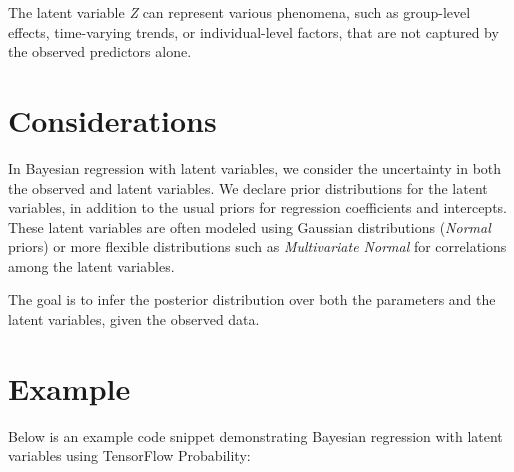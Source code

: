 \documentclass[
  letterpaper,
  DIV=11,
  numbers=noendperiod]{scrreprt}
\begin{document}
The latent variable \emph{Z} can represent various phenomena, such as
group-level effects, time-varying trends, or individual-level factors,
that are not captured by the observed predictors alone.

\section{Considerations}\label{considerations-16}

In Bayesian regression with latent variables, we consider the
uncertainty in both the observed and latent variables. We declare prior
distributions for the latent variables, in addition to the usual priors
for regression coefficients and intercepts. These latent variables are
often modeled using Gaussian distributions (\emph{Normal} priors) or
more flexible distributions such as \emph{Multivariate Normal} for
correlations among the latent variables.

The goal is to infer the posterior distribution over both the parameters
and the latent variables, given the observed data.

\section{Example}\label{example-16}

Below is an example code snippet demonstrating Bayesian regression with
latent variables using TensorFlow Probability:
\end{document}
